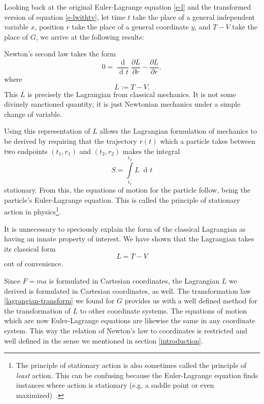 \documentclass[prb,preprint]{revtex4-1}
\DeclareMathOperator{\dd}{d\!}
\DeclareMathOperator{\ddd}{\mathrm{d}}
\begin{document}
Looking back at the original Euler-Lagrange equation \eqref{e-l} and the transformed version of equation \eqref{e-lwithtv}, let time $t$ take the place of a general independent variable $x$, position $r$ take the place of a general coordinate $y$, and $T-V$ take the place of $G$, we arrive at the following results:

Newton's second law takes the form
\begin{equation}
0 = \frac{\ddd}{\dd t} \frac{\partial L}{\partial \dot{r}} - \frac{\partial L}{\partial r},
\end{equation}
where
\begin{equation}
 L := T-V.
\end{equation}
This $L$ is precisely the Lagrangian from classical mechanics. It is not some divinely sanctioned quantity; it is just Newtonian mechanics under a simple change of variable.

Using this representation of $L$ allows the Lagrangian formulation of mechanics to be derived by requiring that the trajectory $r(t)$ which a particle takes between two endpoints $(t_1,r_1)$ and $(t_2,r_2)$ makes the integral
\begin{equation}\label{eqref:action}
S=\int\limits_{t_1}^{t_2} L \; \dd t
\end{equation}
stationary. From this, the equations of motion for the particle follow, being the particle's Euler-Lagrange equation. This is called the principle of stationary action in physics\footnote{The principle of stationary action is also sometimes called the principle of \emph{least} action. This can be confusing because the Euler-Lagrange equation finds instances where action is stationary (e.g. a saddle point or even maximized)~\cite{gray2007action}.}.

It is unnecessary to speciously explain the form of the classical Lagrangian as having an innate property of interest. We have shown that the Lagrangian takes its classical form
\begin{equation}
  L = T-V
\end{equation}
out of convenience.

Since $F=ma$ is formulated in Cartesian coordinates, the Lagrangian $L$ we derived is formulated in Cartesian coordinates, as well. The transformation law \eqref{lagrangian-transform} we found for $G$ provides us with a well defined method for the transformation of $L$ to other coordinate systems. The equations of motion which are now Euler-Lagrange equations are likewise the same in any coordinate system.  This way the relation of Newton's law to coordinates is restricted and well defined in the sense we mentioned in section \ref{introduction}. %
\end{document}
